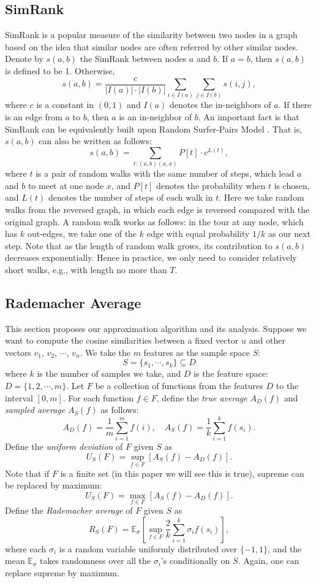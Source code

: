 \documentclass{article}
\begin{document}
\subsection{SimRank}
SimRank \cite{JW02} is a popular measure of the similarity between two nodes in a graph based on the idea that similar nodes are often referred by other similar nodes. Denote by $s(a,b)$ the SimRank between nodes $a$ and $b$. If $a=b$, then $s(a,b)$ is defined to be 1. Otherwise, 
$$s(a,b) = \frac{c}{|I(a)|\cdot|I(b)|}\sum_{i\in I(a)}\sum_{j\in I(b)}s(i,j),$$
where $c$ is a constant in $(0,1)$ and $I(a)$ denotes the in-neighbors of $a$. If there is an edge from $a$ to $b$, then $a$ is an in-neighbor of $b$. 
An important fact is that SimRank can be equivalently built upon Random Surfer-Pairs Model \cite{JW02}. That is, $s(a,b)$ can also be written as follows:
$$s(a,b) = \sum_{t: (a,b) (x,x)} P[t]\cdot c^{L(t)},$$
where $t$ is a pair of random walks with the same number of steps, which lead $a$ and $b$ to meet at one node $x$, and $P[t]$ denotes the probability when $t$ is chosen, and $L(t)$ denotes the number of steps of each walk in $t$. Here we take random walks from the reversed graph, in which each edge is reversed compared with the original graph. A random walk works as follows: in the tour at any node, which has $k$ out-edges, we take one of the $k$ edge with equal probability $1/k$ as our next step. Note that as the length of random walk grows, its contribution to $s(a,b)$ decreases exponentially. Hence in practice, we only need to consider relatively short walks, e.g., with length no more than $T$.

\subsection{Rademacher Average}
This section proposes our approximation algorithm and its analysis.
Suppose we want to compute the cosine similarities between a fixed vector $u$ and other vectors $v_1$, $v_2$, $\cdots$, $v_n$. We take the $m$ features as the sample space $S$:
$$S = \{s_1, \cdots, s_k\} \subseteq D$$
where $k$ is the number of samples we take, and $D$ is the feature space: $D = \{1,2,\cdots,m\}$.
Let $F$ be a collection of functions from the features $D$ to the interval $[0, m]$.
For each function $f\in F$, define the \emph{true average} $A_D(f)$ and \emph{sampled average} $A_S(f)$ as follows:
$$A_D(f) = \frac{1}{m} \sum_{i=1}^m f(i),\quad A_S(f) = \frac{1}{k} \sum_{i=1}^k f(s_i).$$
Define the \emph{uniform deviation} \cite{Oneto13} of $F$ given $S$ as
$$U_S(F) = \sup_{f\in F} [ A_S(f) - A_D(f) ].$$
Note that if $F$ is a finite set (in this paper we will see this is true), supreme can be replaced by maximum:
$$U_S(F) = \max_{f\in F} [ A_S(f) - A_D(f) ].$$
Define the \emph{Rademacher average} \cite{Mohri09,BM02,Oneto13} of $F$ given $S$ as
\newcommand{\E}{\mathbb{E}}
$$R_S(F) = \E_\sigma \left[\sup_{f\in F} \frac{2}{k}\sum_{i=1}^k \sigma_i f(s_i) \right],$$
where each $\sigma_i$ is a random variable uniformly distributed over $\{-1, 1\}$, and the mean $\E_\sigma$ takes randomness over all the $\sigma_i$'s conditionally on $S$. Again, one can replace supreme by maximum.
\end{document}
